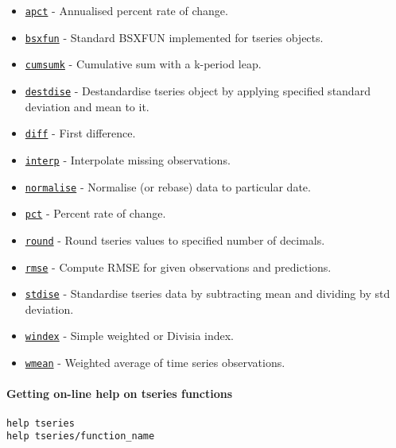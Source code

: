 \begin{itemize}
\itemsep1pt\parskip0pt
\item
  \href{tseries/apct}{\texttt{apct}} - Annualised percent rate of
  change.
\item
  \href{tseries/bsxfun}{\texttt{bsxfun}} - Standard BSXFUN implemented
  for tseries objects.
\item
  \href{tseries/cumsumk}{\texttt{cumsumk}} - Cumulative sum with a
  k-period leap.
\item
  \href{tseries/destdise}{\texttt{destdise}} - Destandardise tseries
  object by applying specified standard deviation and mean to it.
\item
  \href{tseries/diff}{\texttt{diff}} - First difference.
\item
  \href{tseries/interp}{\texttt{interp}} - Interpolate missing
  observations.
\item
  \href{tseries/normalise}{\texttt{normalise}} - Normalise (or rebase)
  data to particular date.
\item
  \href{tseries/pct}{\texttt{pct}} - Percent rate of change.
\item
  \href{tseries/round}{\texttt{round}} - Round tseries values to
  specified number of decimals.
\item
  \href{tseries/rmse}{\texttt{rmse}} - Compute RMSE for given
  observations and predictions.
\item
  \href{tseries/stdise}{\texttt{stdise}} - Standardise tseries data by
  subtracting mean and dividing by std deviation.
\item
  \href{tseries/windex}{\texttt{windex}} - Simple weighted or Divisia
  index.
\item
  \href{tseries/wmean}{\texttt{wmean}} - Weighted average of time series
  observations.
\end{itemize}

\paragraph{Getting on-line help on tseries
functions}\label{getting-on-line-help-on-tseries-functions}

\begin{verbatim}
help tseries
help tseries/function_name
\end{verbatim}



